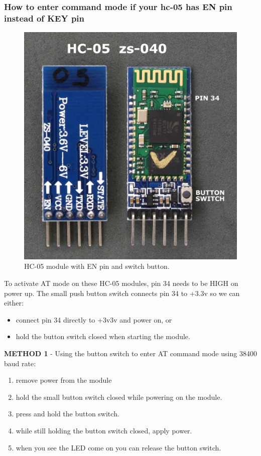 \subsubsection{How to enter command mode if your hc-05 has EN pin instead of KEY pin}
\begin{figure}[H]
	\centering
	\includegraphics[width=\textwidth]
	{files/images/hc05_en_pin}
	\caption{HC-05 module with EN pin and switch button.}
\end{figure}
To activate AT mode on these HC-05 modules, pin 34 needs to be HIGH on power up. The small push button switch connects pin 34 to +3.3v so we can either:
\begin{itemize}
	\item connect pin 34 directly to +3v3v and power on, or
	\item hold the button switch closed when starting the module.
	
\end{itemize}
\textbf{METHOD 1} - Using the button switch to enter AT command mode using 38400 baud rate:
\begin{enumerate}
	\item remove power from the module
	\item hold the small button switch closed while powering on the module.
	\item press and hold the button switch.
	\item while still holding the button switch closed, apply power.
	\item when you see the LED come on you can release the button switch.
\end{enumerate}
